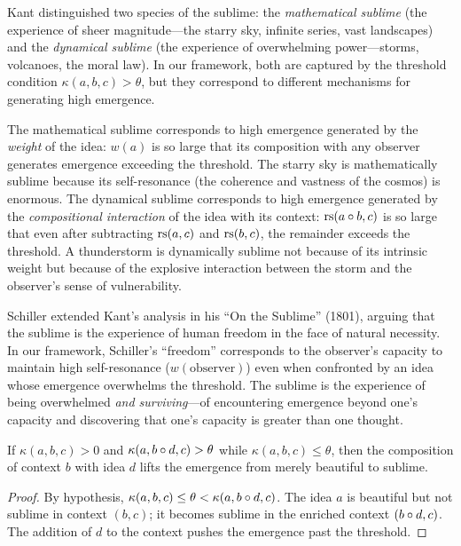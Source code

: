 \begin{interpretation}
\label{interp:mathematical-dynamical-sublime}
Kant distinguished two species of the sublime: the \emph{mathematical sublime} (the experience of sheer magnitude---the starry sky, infinite series, vast landscapes) and the \emph{dynamical sublime} (the experience of overwhelming power---storms, volcanoes, the moral law).  In our framework, both are captured by the threshold condition $\kappa(a, b, c) > \theta$, but they correspond to different mechanisms for generating high emergence.

The mathematical sublime corresponds to high emergence generated by the \emph{weight} of the idea: $w(a)$ is so large that its composition with any observer generates emergence exceeding the threshold.  The starry sky is mathematically sublime because its self-resonance (the coherence and vastness of the cosmos) is enormous.  The dynamical sublime corresponds to high emergence generated by the \emph{compositional interaction} of the idea with its context: $\mathrm{rs}(a \circ b, c)$ is so large that even after subtracting $\mathrm{rs}(a, c)$ and $\mathrm{rs}(b, c)$, the remainder exceeds the threshold.  A thunderstorm is dynamically sublime not because of its intrinsic weight but because of the explosive interaction between the storm and the observer's sense of vulnerability.

Schiller extended Kant's analysis in his ``On the Sublime'' (1801), arguing that the sublime is the experience of human freedom in the face of natural necessity.  In our framework, Schiller's ``freedom'' corresponds to the observer's capacity to maintain high self-resonance ($w(\text{observer})$) even when confronted by an idea whose emergence overwhelms the threshold.  The sublime is the experience of being overwhelmed \emph{and surviving}---of encountering emergence beyond one's capacity and discovering that one's capacity is greater than one thought.
\end{interpretation}

\begin{theorem}
\label{thm:composition-sublimity}
If $\kappa(a, b, c) > 0$ and $\kappa(a, b \circ d, c) > \theta$ while $\kappa(a, b, c) \leq \theta$, then the composition of context $b$ with idea $d$ lifts the emergence from merely beautiful to sublime.
\end{theorem}

\begin{proof}
By hypothesis, $\kappa(a, b, c) \leq \theta < \kappa(a, b \circ d, c)$.  The idea $a$ is beautiful but not sublime in context $(b, c)$; it becomes sublime in the enriched context $(b \circ d, c)$.  The addition of $d$ to the context pushes the emergence past the threshold.
\end{proof}

